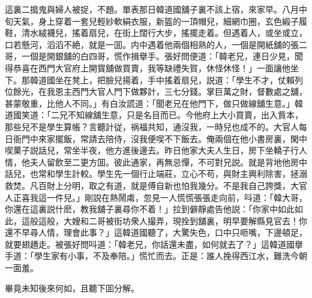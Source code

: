 這裏二搗鬼與婦人被捉，不題。單表那日韓道國舖子裏不該上宿，來家早。八月中旬天氣，身上穿着一套兒輕紗軟絹衣服，新盔的一頂帽兒，細網巾圈，玄色緞子履鞋，清水絨襪兒，搖着扇兒，在街上闊行大步，搖擺走着。但遇着人，或坐或立，口若懸河，滔滔不絶，就是一囬。内中遇着他兩個相熟的人，一個是開紙舖的張二哥，一個是開銀舖的白四哥，慌作揖擧手。張好問便道：「韓老兄，連日少見，聞得恭喜在西門大官府上開寳舖做買賣，我等缺禮失賀，休怪休怪！」一面讓他坐下。那韓道國坐在凳上，把臉兒揚着，手中搖着扇兒，説道：「學生不才，仗賴列位餘光，在我恩主西門大官人門下做夥計，三七分錢。掌巨萬之財，督數處之舖，甚蒙敬重，比他人不同。」有白汝謊道：「聞老兄在他門下，做只做線舖生意。」韓道國笑道：「二兄不知線舖生意，只是名目而已。今他府上大小買賣，出入貲本，那些兒不是學生算帳？言聽計従，祸福共知，通沒我，一時兒也成不的。大官人每日衙門中來家擺飯，常請去陪侍，沒我便喫不下飯去。俺兩個在他小書房裏，閑中喫菓子説話兒，常坐半夜，他方進後邊去。昨日他家大夫人生日，房下坐轎子行人情，他夫人留飲至二更方囬。彼此通家，再無忌憚，不可對兄説。就是背地他房中話兒，也常和學生計較。學生先一個行止端莊，立心不苟，與財主興利除害，拯溺救焚。凡百財上分明，取之有道，就是傅自新也怕我幾分。不是我自己誇獎，大官人正喜我這一件兒。」剛説在熱鬧䖏，忽見一人慌慌張張走向前，呌道：「韓大哥，你還在這裏説什麽，教我舖子裏尋你不着！」拉到僻靜處告他説：「你家中如此如此，這般這般，大嫂和二哥被街坊衆人撮弄，現拴到舖裏，明早要解縣見官去！你還不早尋人情，理會此事？」這韓道國聽了，大驚失色，口中只咂嘴，下邊頓足，就要翅趫走。被張好問呌道：「韓老兄，你話還未盡，如何就去了？」這韓道國擧手道：「學生家有小事，不及奉陪。」慌忙而去。正是：誰人挽得西江水，難洗今朝一面羞。

畢竟未知後來何如，且聽下囬分解。

